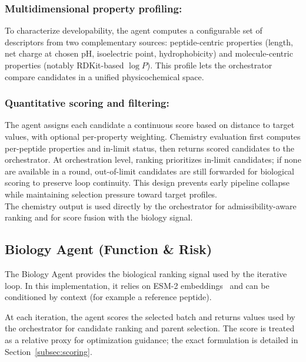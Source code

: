 \subsubsection{Multidimensional property profiling:}
To characterize developability, the agent computes a configurable set of descriptors from two complementary sources: peptide-centric properties (length, net charge at chosen pH, isoelectric point, hydrophobicity) and molecule-centric properties (notably RDKit-based \(\log P\)). This profile lets the orchestrator compare candidates in a unified physicochemical space.

\subsubsection{Quantitative scoring and filtering:}
The agent assigns each candidate a continuous score based on distance to target values, with optional per-property weighting. Chemistry evaluation first computes per-peptide properties and in-limit status, then returns scored candidates to the orchestrator. At orchestration level, ranking prioritizes in-limit candidates; if none are available in a round, out-of-limit candidates are still forwarded for biological scoring to preserve loop continuity. This design prevents early pipeline collapse while maintaining selection pressure toward target profiles.
\\

The chemistry output is used directly by the orchestrator for admissibility-aware ranking and for score fusion with the biology signal.

\subsection{Biology Agent (Function \& Risk)}\label{subsec:biology}
The Biology Agent provides the biological ranking signal used by the iterative loop. In this implementation, it relies on ESM-2 embeddings~\cite{rives2021biological,esmgithub} and can be conditioned by context (for example a reference peptide).

At each iteration, the agent scores the selected batch and returns values used by the orchestrator for candidate ranking and parent selection. The score is treated as a relative proxy for optimization guidance; the exact formulation is detailed in Section~\ref{subsec:scoring}.
